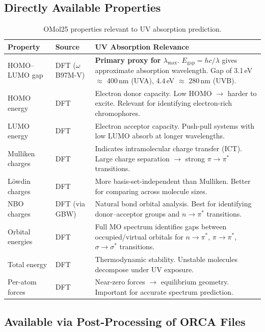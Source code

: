 \documentclass[11pt,a4paper]{article}
\begin{document}
\subsection{Directly Available Properties}

\begin{table}[h]
\centering
\small
\begin{tabular}{@{}llp{6cm}@{}}
\toprule
\textbf{Property} & \textbf{Source} & \textbf{UV Absorption Relevance} \\
\midrule
HOMO--LUMO gap & DFT ($\omega$B97M-V) &
    \textbf{Primary proxy for $\lambda_\text{max}$}.
    $E_\text{gap} = hc/\lambda$ gives approximate absorption wavelength.
    Gap of 3.1\,eV $\approx$ 400\,nm (UVA), 4.4\,eV $\approx$ 280\,nm (UVB). \\
HOMO energy & DFT & Electron donor capacity. Low HOMO $\to$ harder to
    excite. Relevant for identifying electron-rich chromophores. \\
LUMO energy & DFT & Electron acceptor capacity. Push-pull systems with
    low LUMO absorb at longer wavelengths. \\
Mulliken charges & DFT & Indicates intramolecular charge transfer (ICT).
    Large charge separation $\to$ strong $\pi \to \pi^*$ transitions. \\
L\"owdin charges & DFT & More basis-set-independent than Mulliken.
    Better for comparing across molecule sizes. \\
NBO charges & DFT (via GBW) & Natural bond orbital analysis. Best
    for identifying donor--acceptor groups and $n \to \pi^*$ transitions. \\
Orbital energies & DFT & Full MO spectrum identifies gaps between
    occupied/virtual orbitals for $n \to \pi^*$, $\pi \to \pi^*$,
    $\sigma \to \sigma^*$ transitions. \\
Total energy & DFT & Thermodynamic stability. Unstable molecules
    decompose under UV exposure. \\
Per-atom forces & DFT & Near-zero forces $\to$ equilibrium geometry.
    Important for accurate spectrum prediction. \\
\bottomrule
\end{tabular}
\caption{OMol25 properties relevant to UV absorption prediction.}
\end{table}

\subsection{Available via Post-Processing of ORCA Files}
\end{document}
